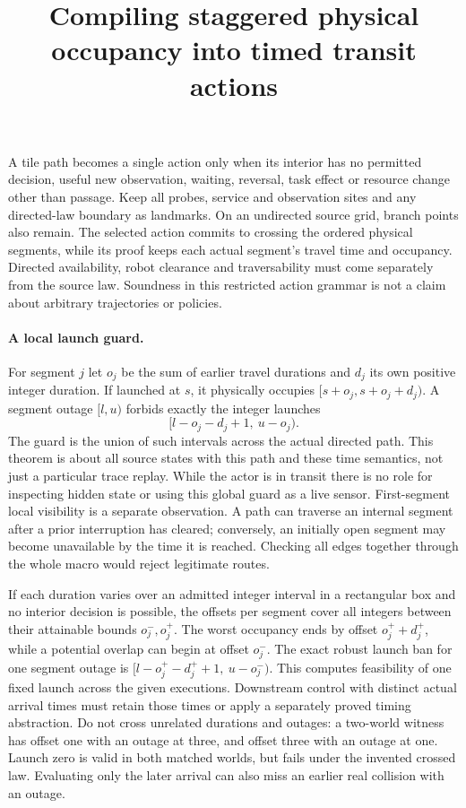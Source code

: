 \documentclass[11pt]{article}
\title{Compiling staggered physical occupancy into timed transit actions}
\author{}\date{}
\begin{document}
\maketitle
A tile path becomes a single action only when its interior has no permitted
decision, useful new observation, waiting, reversal, task effect or
resource change other than passage. Keep all probes, service and
observation sites and any directed-law boundary as landmarks. On an
undirected source grid, branch points also remain. The selected action
commits to crossing the ordered physical segments, while its proof keeps
each actual segment's travel time and occupancy. Directed availability,
robot clearance and traversability must come separately from the source
law. Soundness in this restricted action grammar is not a claim about
arbitrary trajectories or policies.

\paragraph{A local launch guard.}
For segment $j$ let $o_j$ be the sum of earlier travel durations and $d_j$
its own positive integer duration. If launched at $s$, it physically
occupies $[s+o_j,s+o_j+d_j)$. A segment outage $[l,u)$ forbids exactly the
integer launches
\[
                 [l-o_j-d_j+1,\ u-o_j).
\]
The guard is the union of such intervals across the actual directed
path. This theorem is about all source states with this path and these
time semantics, not just a particular trace replay. While the actor is
in transit there is no role for inspecting hidden state or using this
global guard as a live sensor. First-segment local visibility is a
separate observation. A path can traverse an internal segment after a
prior interruption has cleared; conversely, an initially open segment
may become unavailable by the time it is reached. Checking all edges
together through the whole macro would reject legitimate routes.

If each duration varies over an admitted integer interval in a
rectangular box and no interior decision is possible, the offsets per
segment cover all integers between their attainable bounds
$o_j^{-},o_j^{+}$. The worst occupancy ends by offset
$o_j^{+}+d_j^{+}$, while a potential overlap can begin at offset
$o_j^{-}$. The exact robust launch ban for one segment outage is
$[l-o_j^{+}-d_j^{+}+1,\ u-o_j^{-})$.
This computes feasibility of one fixed launch across the given
executions. Downstream control with distinct actual arrival times must
retain those times or apply a separately proved timing abstraction.
Do not cross unrelated durations and outages: a two-world witness has
offset one with an outage at three, and offset three with an outage at
one. Launch zero is valid in both matched worlds, but fails under the
invented crossed law. Evaluating only the later arrival can also miss
an earlier real collision with an outage.
\end{document}
